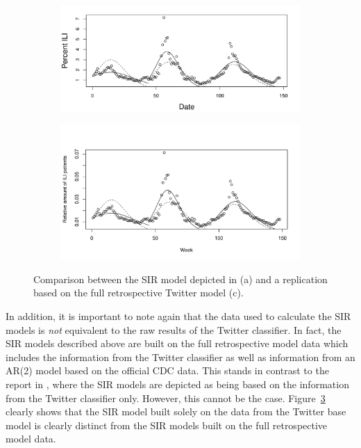 \documentclass[11pt, a4paper,twoside]{report}\usepackage[]{graphicx}\usepackage[]{color}
\begin{document}
\begin{figure}[H]
\centering
  \begin{subfigure}[t]{1\textwidth}
  \includegraphics[width=1\linewidth]{02_todd_bodnar_SIR.png}
  \caption{}
  \label{fig:SIR_comparison_original}
  \end{subfigure}

  \begin{subfigure}[t]{1\textwidth}
  \includegraphics[width=1\linewidth]{39_SIR_model_full_model_25.pdf}
  \caption{}
  \label{fig:SIR_comparison_full}
  \end{subfigure}
  \caption{Comparison between the SIR model depicted in \citep{bodnar_data_2015} (a) and a replication based on the full retrospective Twitter model (c).}
  \label{fig:TwitterModel_comparison}
\end{figure}

In addition, it is important to note again that the data used to calculate the SIR models is \textit{not} equivalent to the raw results of the Twitter classifier. In fact, the SIR models described above are built on the full retrospective model data which includes the information from the Twitter classifier as well as information from an AR(2) model based on the official CDC data. This stands in contrast to the report in \cite{bodnar_data_2015}, where the SIR models are depicted as being based on the information from the Twitter classifier only. However, this cannot be the case. Figure~\ref{fig:TwitterModel_comparison} clearly shows that the SIR model built solely on the data from the Twitter base model is clearly distinct from the SIR models built on the full retrospective model data.  
\end{document}
